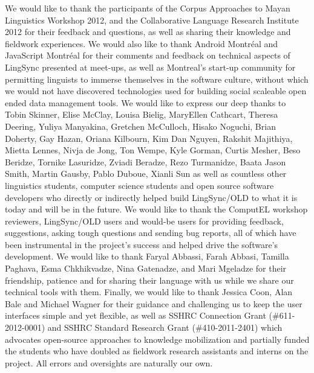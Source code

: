 \documentclass[11pt]{article}
\begin{document}
We would like to thank the participants of the Corpus Approaches to Mayan Linguistics Workshop 2012, and the  
Collaborative Language Research Institute 2012  for their feedback and questions, as well as sharing their knowledge and fieldwork experiences. We would also like to thank 
Android Montr\'eal and JavaScript Montr\'eal for their comments and feedback on technical aspects of LingSync presented at meet-ups,
as well as Montreal's start-up community for permitting linguists to immerse themselves in the software culture, 
without which we would not have discovered technologies  used for building social scaleable open ended data management tools.
We would like to express our deep thanks to Tobin Skinner,
Elise McClay,
Louisa Bielig,
MaryEllen Cathcart,
Theresa Deering,
Yuliya Manyakina,
Gretchen McCulloch, 
Hisako Noguchi, 
Brian Doherty, 
Gay Hazan,
Oriana Kilbourn,
Kim Dan Nguyen,
Rakshit Majithiya,
Mietta Lennes,
Nivja de Jong,
Ton Wempe,
Kyle Gorman,
Curtis Mesher,
Beso Beridze, 
Tornike Lasuridze, 
Zviadi Beradze, 
Rezo Turmanidze,
Baata
Jason Smith,
Martin Gausby,
Pablo Duboue,
Xianli Sun as well as countless other linguistics students,  computer science students and open source software developers  who directly or indirectly helped build LingSync/OLD to what it is today and will be in the future. 
We would like to thank the ComputEL workshop reviewers, LingSync/OLD users and would-be users for providing feedback, suggestions,  asking tough questions and sending bug reports, all of which have been instrumental
 in the project's success and helped drive
 the software's development.
 We would like to thank Faryal Abbassi, Farah Abbasi, Tamilla Paghava, Esma Chkhikvadze, Nina Gatenadze, and Mari Mgeladze for their friendship, patience and for sharing their language with us while we share our  technical tools with them.
Finally, we would like to thank Jessica Coon, Alan Bale and Michael
Wagner for their guidance and challenging us to keep the user interfaces simple
and yet flexible, as well as SSHRC Connection Grant (\#611-2012-0001)
and SSHRC Standard Research Grant (\#410-2011-2401) which 
 advocates open-source approaches to knowledge mobilization and
partially funded the students who have doubled as fieldwork research
assistants and interns on the project. All errors and oversights are
naturally our own.  

\printglossary




\end{document}
